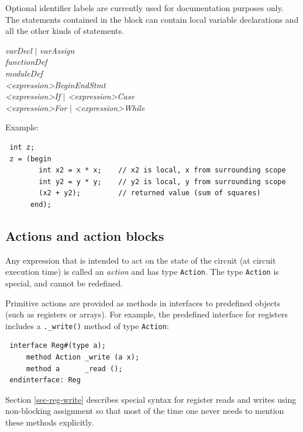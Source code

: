 \documentclass[twoside,letterpaper]{article}
\newcommand{\hm}{\hspace*{1em}}
\newcommand{\nterm}[1]{\emph{#1}}
\newcommand{\term}[1]{\texttt{#1}}
\newcommand{\alt}{{$\mid$}}
\newcommand{\gram}[2]{    \hm\makebox[10em][l]{\it #1}\makebox[1.5em][l]{::=}    #2}
\newcommand{\gramalt}[1]{ \hm\makebox[10em][l]{      }\makebox[1.5em][l]{\alt}   #1}
\begin{document}
Optional identifier labels are currently used for documentation
purposes only.  The statements contained in the block can contain
local variable declarations and all the other kinds of statements.


\gram{expressionStmt}       { \nterm{varDecl} {\alt} \nterm{varAssign} } \\
\gramalt       { \nterm{functionDef} } \\
\gramalt       { \nterm{moduleDef} } \\
\gramalt       { \nterm{<expression>BeginEndStmt} } \\
\gramalt       { \nterm{<expression>If} {\alt} \nterm{<expression>Case} } \\
\gramalt       { \nterm{<expression>For} } {\alt} { \nterm{<expression>While}}




Example:
\begin{verbatim}
 int z;
 z = (begin
        int x2 = x * x;    // x2 is local, x from surrounding scope
        int y2 = y * y;    // y2 is local, y from surrounding scope
        (x2 + y2);         // returned value (sum of squares)
      end);
\end{verbatim}


\subsection{Actions and action blocks}

\label{sec-actions}

Any expression that is intended to act on the state of the circuit (at circuit
execution time) is called an {\emph{action}} and has type \texttt{Action}.
The type \texttt{Action} is special, and cannot be redefined.

Primitive actions are provided as methods in interfaces to predefined
objects (such as registers or arrays).  For example, the predefined
interface for registers includes a \texttt{.\_write()} method of type
\texttt{Action}:
\begin{verbatim}
 interface Reg#(type a);
     method Action _write (a x);
     method a      _read ();
 endinterface: Reg
\end{verbatim}
Section \ref{sec-reg-write} describes special syntax for register
reads and writes using non-blocking assignment so that most of the
time one never needs to mention these methods explicitly.
\end{document}

